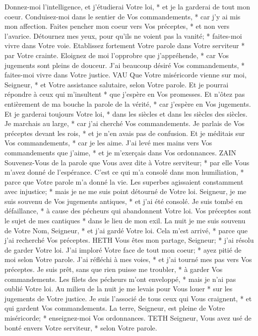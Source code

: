 Donnez-moi l'intelligence, et j'étudierai Votre loi, * et je la garderai de tout mon coeur.
Conduisez-moi dans le sentier de Vos commandements, * car j'y ai mis mon affection.
Faites pencher mon coeur vers Vos préceptes, * et non vers l'avarice.
Détournez mes yeux, pour qu'ils ne voient pas la vanité; * faites-moi vivre dans Votre voie.
Etablissez fortement Votre parole dans Votre serviteur * par Votre crainte.
Eloignez de moi l'opprobre que j'appréhende, * car Vos jugements sont pleins de douceur.
J'ai beaucoup désiré Vos commandements, * faites-moi vivre dans Votre justice.
VAU
Que Votre miséricorde vienne sur moi, Seigneur, * et Votre assistance salutaire, selon Votre parole.
Et je pourrai répondre à ceux qui m'insultent * que j'espère en Vos promesses.
Et n'ôtez pas entièrement de ma bouche la parole de la vérité, * car j'espère en Vos jugements.
Et je garderai toujours Votre loi, * dans les siècles et dans les siècles des siècles.
Je marchais au large, * car j'ai cherché Vos commandements.
Je parlais de Vos préceptes devant les rois, * et je n'en avais pas de confusion.
Et je méditais sur Vos commandements, * car je les aime.
J'ai levé mes mains vers Vos commandements que j'aime, * et je m'exerçais dans Vos ordonnances.
ZAIN
Souvenez-Vous de la parole que Vous avez dite à Votre serviteur; * par elle Vous m'avez donné de l'espérance.
C'est ce qui m'a consolé dans mon humiliation, * parce que Votre parole m'a donné la vie.
Les superbes agissaient constamment avec injustice; * mais je ne me suis point détourné de Votre loi.
Seigneur, je me suis souvenu de Vos jugements antiques, * et j'ai été consolé.
Je suis tombé en défaillance, * à cause des pécheurs qui abandonnent Votre loi.
Vos préceptes sont le sujet de mes cantiques * dans le lieu de mon exil.
La nuit je me suis souvenu de Votre Nom, Seigneur, * et j'ai gardé Votre loi.
Cela m'est arrivé, * parce que j'ai recherché Vos préceptes.
HETH
Vous êtes mon partage, Seigneur; * j'ai résolu de garder Votre loi.
J'ai imploré Votre face de tout mon coeur; * ayez pitié de moi selon Votre parole.
J'ai réfléchi à mes voies, * et j'ai tourné mes pas vers Vos préceptes.
Je suis prêt, sans que rien puisse me troubler, * à garder Vos commandements.
Les filets des pécheurs m'ont enveloppé, * mais je n'ai pas oublié Votre loi.
Au milieu de la nuit je me levais pour Vous louer * sur les jugements de Votre justice.
Je suis l'associé de tous ceux qui Vous craignent, * et qui gardent Vos commandements.
La terre, Seigneur, est pleine de Votre miséricorde; * enseignez-moi Vos ordonnances.
TETH
Seigneur, Vous avez usé de bonté envers Votre serviteur, * selon Votre parole.
